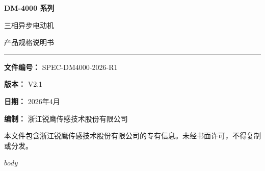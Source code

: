 \documentclass[a4paper,10pt]{article}
\begin{document}
\thispagestyle{empty}
\begin{titlepage}
\noindent
\colorbox{primary}{%
  \begin{minipage}[c][\paperheight][c]{\paperwidth}
    \centering\color{white}
    \vspace*{60mm}

    {\fontsize{36pt}{42pt}\selectfont\bfseries DM-4000 系列\par}
    \vspace{8mm}
    {\fontsize{20pt}{26pt}\selectfont\color{white!80} 三相异步电动机\par}
    \vspace{15mm}
    {\fontsize{16pt}{22pt}\selectfont\color{white!70} 产品规格说明书\par}

    \vspace{20mm}
    {\color{white!30}\rule{0.6\paperwidth}{0.5pt}\par}
    \vspace{15mm}

    {\normalsize
      \textbf{文件编号：} SPEC-DM4000-2026-R1\par\vspace{2mm}
      \textbf{版本：} V2.1\par\vspace{2mm}
      \textbf{日期：} 2026年4月\par\vspace{2mm}
      \textbf{编制：} 浙江锐鹰传感技术股份有限公司\par
    }

    \vfill
    {\scriptsize\color{white!50}
      本文件包含浙江锐鹰传感技术股份有限公司的专有信息。未经书面许可，不得复制或分发。\par
    }
    \vspace{15mm}
  \end{minipage}%
}
\restoregeometry
\end{titlepage}

$body$
\end{document}
